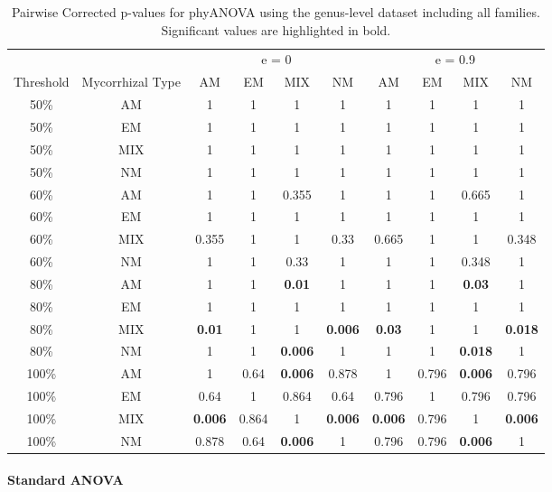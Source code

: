 \documentclass[]{article}
\let\oldparagraph\paragraph
\renewcommand{\paragraph}[1]{\oldparagraph{#1}\mbox{}}
\begin{document}
\begin{table}[H]

\caption{\label{tab:unnamed-chunk-32}Pairwise Corrected p-values for phyANOVA using the genus-level dataset including all families. Significant values are highlighted in bold.}
\centering
\begin{tabular}{c|c|c|c|c|c|c|c|c|c}
\hline
\multicolumn{2}{c|}{ } & \multicolumn{4}{c|}{e = 0} & \multicolumn{4}{c}{e = 0.9} \\
\cline{3-6} \cline{7-10}
Threshold & Mycorrhizal Type & AM & EM & MIX & NM & AM & EM & MIX & NM\\
\hline
50\% & AM & 1 & 1 & 1 & 1 & 1 & 1 & 1 & 1\\
\hline
50\% & EM & 1 & 1 & 1 & 1 & 1 & 1 & 1 & 1\\
\hline
50\% & MIX & 1 & 1 & 1 & 1 & 1 & 1 & 1 & 1\\
\hline
50\% & NM & 1 & 1 & 1 & 1 & 1 & 1 & 1 & 1\\
\hline
60\% & AM & 1 & 1 & 0.355 & 1 & 1 & 1 & 0.665 & 1\\
\hline
60\% & EM & 1 & 1 & 1 & 1 & 1 & 1 & 1 & 1\\
\hline
60\% & MIX & 0.355 & 1 & 1 & 0.33 & 0.665 & 1 & 1 & 0.348\\
\hline
60\% & NM & 1 & 1 & 0.33 & 1 & 1 & 1 & 0.348 & 1\\
\hline
80\% & AM & 1 & 1 & \textbf{0.01} & 1 & 1 & 1 & \textbf{0.03} & 1\\
\hline
80\% & EM & 1 & 1 & 1 & 1 & 1 & 1 & 1 & 1\\
\hline
80\% & MIX & \textbf{0.01} & 1 & 1 & \textbf{0.006} & \textbf{0.03} & 1 & 1 & \textbf{0.018}\\
\hline
80\% & NM & 1 & 1 & \textbf{0.006} & 1 & 1 & 1 & \textbf{0.018} & 1\\
\hline
100\% & AM & 1 & 0.64 & \textbf{0.006} & 0.878 & 1 & 0.796 & \textbf{0.006} & 0.796\\
\hline
100\% & EM & 0.64 & 1 & 0.864 & 0.64 & 0.796 & 1 & 0.796 & 0.796\\
\hline
100\% & MIX & \textbf{0.006} & 0.864 & 1 & \textbf{0.006} & \textbf{0.006} & 0.796 & 1 & \textbf{0.006}\\
\hline
100\% & NM & 0.878 & 0.64 & \textbf{0.006} & 1 & 0.796 & 0.796 & \textbf{0.006} & 1\\
\hline
\end{tabular}
\end{table}

\hypertarget{standard-anova-7}{%
\paragraph{Standard ANOVA}\label{standard-anova-7}}
\end{document}
